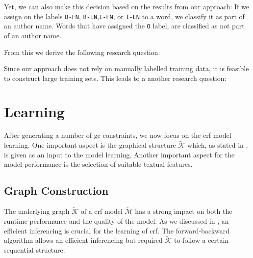 Yet, we can also make this decision based on the results from our approach:
If we assign on the labels \texttt{B-FN}, \texttt{B-LN},\texttt{I-FN}, or \texttt{I-LN} to a word, we classify it as part of an author name.
Words that have assigned the \texttt{O} label, are classified as not part of an author name.

From this we derive the following research question:
\newcommand\researchquestionfive{}
\researchquestionfive%


\bigskip

Since our approach does not rely on manually labelled training data, it is feasible to construct large training sets.
This leads to a another research question:
\newcommand\researchquestionsix{}
\researchquestionsix%




\section{Learning }\label{sec:ae-learning-crfs}

After generating a number of \gls{ge} constraints, we now focus on the \gls{crf} model learning.
One important aspect is the graphical structure $\mathcal{\tilde{K}}$ which, as stated in , is given as an input to the model learning.
Another important aspect for the model performance is the selection of suitable textual features.

\subsection{Graph Construction}\label{subsec:ae-graph-construction}

The underlying graph $\mathcal{\tilde{K}}$ of a \gls{crf} model $\mathcal{\tilde{M}}$ has a strong impact on both the runtime performance and the quality of the model.
As we discussed in , an efficient inferencing is crucial for the learning of \gls{crf}.
The \gls{forward-backward algorithm} allows an efficient inferencing but required $\mathcal{\tilde{K}}$ to follow a certain sequential structure.

